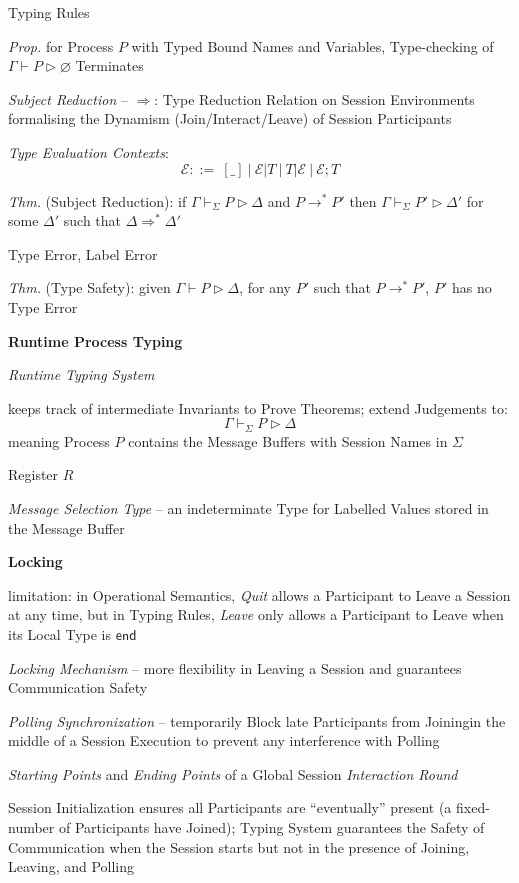 Typing Rules %

\emph{Prop.} for Process $P$ with Typed Bound Names and Variables,
Type-checking of $\Gamma \vdash P \rhd \varnothing$ Terminates


\emph{Subject Reduction} -- $\Rightarrow$: Type Reduction Relation on
Session Environments formalising the Dynamism (Join/Interact/Leave) of
Session Participants

\emph{Type Evaluation Contexts}:
\[
  \mathscr{E} ::=\ [\_] \ |\ \mathscr{E}|T \
    |\ T|\mathscr{E} \ |\ \mathscr{E};T
\]

\emph{Thm.} (Subject Reduction): if $\Gamma \vdash_\Sigma P \rhd
\Delta$ and $P \rightarrow^* P'$ then $\Gamma \vdash_\Sigma P' \rhd
\Delta'$ for some $\Delta'$ such that $\Delta \Rightarrow^* \Delta'$

Type Error, Label Error

\emph{Thm.} (Type Safety): given $\Gamma \vdash P \rhd \Delta$, for
any $P'$ such that $P \rightarrow^* P'$, $P'$ has no Type Error


\textbf{Runtime Process Typing}

\emph{Runtime Typing System}


keeps track of intermediate Invariants to Prove Theorems; extend
Judgements to:
\[
  \Gamma \vdash_\Sigma P \rhd \Delta
\]
meaning Process $P$ contains the Message Buffers with Session Names in
$\Sigma$

Register $R$

\emph{Message Selection Type} -- an indeterminate Type for Labelled
Values stored in the Message Buffer %


\textbf{Locking}

limitation: in Operational Semantics, \emph{Quit} allows a Participant
to Leave a Session at any time, but in Typing Rules, \emph{Leave} only
allows a Participant to Leave when its Local Type is $\mathsf{end}$

\emph{Locking Mechanism} -- more flexibility in Leaving a Session and
guarantees Communication Safety

\emph{Polling Synchronization} -- temporarily Block late Participants
from Joiningin the middle of a Session Execution to prevent any
interference with Polling

\emph{Starting Points} and \emph{Ending Points} of a Global Session
\emph{Interaction Round}

Session Initialization ensures all Participants are ``eventually''
present (a fixed-number of Participants have Joined); Typing System
guarantees the Safety of Communication when the Session starts but not
in the presence of Joining, Leaving, and Polling

